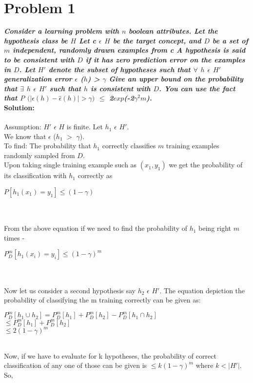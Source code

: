 \documentclass[12pt,letterpaper]{article}
\begin{document}
\section*{Problem 1}

\textbf{\emph{Consider a learning problem with $n$ boolean attributes. Let the hypothesis class be $H$ Let c
$\epsilon$ $H$ be the target concept, and $D$ be a set of $m$ independent, randomly drawn examples from c A hypothesis
is said to be consistent with $D$ if it has zero prediction error on the examples in $D$. Let $H'$ denote the subset
of hypotheses such that $\forall$ $ h$ $ \epsilon$ $H'$generalization error $\epsilon$ ($ℎ$) > $\gamma$ Give an upper bound on the probability that
 $\exists$ $ℎ$ $\epsilon$ $H'$
such that $ℎ$ is consistent with $D$. You can use the fact that $P$ $(| \epsilon(h) - \widehat{\epsilon}(h)|  $$>$$  \gamma )$ $\leq$ 2$exp$(-2$\gamma ^{2}m$).
}}
\\
\textbf{Solution:}\\ \\
Assumption: $H'$ $\epsilon$ $H$ is finite. Let $h_1$ $\epsilon$ $H'$. \\
We know that $\epsilon$ ($h_1$ $>$ $\gamma$). \\
To find: The probability that $h_1$ correctly classifies $m$ training examples randomly sampled from $D$. \\
Upon taking single training example such as $(x_1, y_1)$ we get the probability of its classification with $h_1$ correctly as
\begin{center}$P[h_1(x_1) = y_1] \leq (1-\gamma)$\end{center} \\\\
From the above equation if we need to find the probability of $h_1$ being right $m$ times -
\begin{center}$P^{m}_D[h_1(x_i) = y_i] \leq (1-\gamma)^{m}$ \end{center} \\\\
Now let us consider a second hypothesis say $h_2$ $\epsilon$ $H'$. The equation depiction the probability of classifying the m training correctly can be given as:
\begin{center} $P^{m}_D[h_1 \cup h_2]= P^{m}_D[h_1]+P^{m}_D[h_2]-P^{m}_D[h_1 \cap h_2]$ \\$\leq P^{m}_D[h_1]+P^{m}_D[h_2] $\\
$\leq 2(1-\gamma)^{m}$\end{center} 
\\
Now, if we have to evaluate for k hypotheses, the probability of correct classification of any one of those can be given is $\leq k(1-\gamma)^{m}$ where $k < |H'|$. So,
\end{document}
